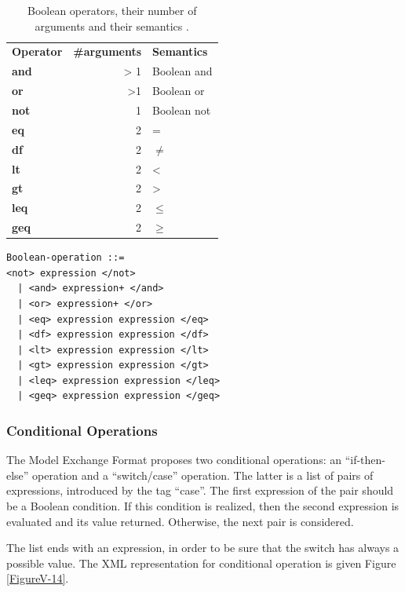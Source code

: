 \documentclass[11pt]{article}
\begin{document}
\begin{table}[htbp]
\caption{Boolean operators, their number of arguments and their semantics \label{TableV-3}.}
\centering
\begin{tabular}{lrl}
\textbf{Operator} & \textbf{\#arguments} & \textbf{Semantics}\\
\textbf{and} & > 1 & Boolean and\\
\textbf{or} & >1 & Boolean or\\
\textbf{not} & 1 & Boolean not\\
\textbf{eq} & 2 & =\\
\textbf{df} & 2 & \(\neq\)\\
\textbf{lt} & 2 & <\\
\textbf{gt} & 2 & >\\
\textbf{leq} & 2 & \(\le\)\\
\textbf{geq} & 2 & \(\ge\)\\
\end{tabular}
\end{table}


\begin{lstlisting}
Boolean-operation ::=
<not> expression </not>
  | <and> expression+ </and>
  | <or> expression+ </or>
  | <eq> expression expression </eq>
  | <df> expression expression </df>
  | <lt> expression expression </lt>
  | <gt> expression expression </gt>
  | <leq> expression expression </leq>
  | <geq> expression expression </geq>
\end{lstlisting}



\subsubsection{Conditional Operations}
\label{sec:org7fd4c8c}

The Model Exchange Format proposes two conditional operations: an
``if-then-else'' operation and a ``switch/case'' operation. The latter is a
list of pairs of expressions, introduced by the tag ``case''. The first
expression of the pair should be a Boolean condition. If this condition
is realized, then the second expression is evaluated and its value
returned. Otherwise, the next pair is considered.

The list ends with an expression, in order to be sure that the switch
has always a possible value. The XML representation for conditional
operation is given Figure \ref{FigureV-14}.
\end{document}
